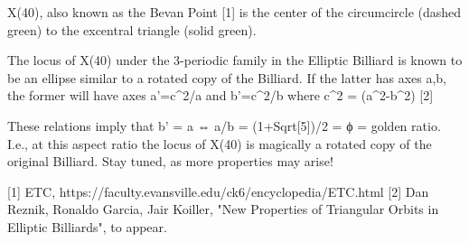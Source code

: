 X(40), also known as the Bevan Point [1] is the center of the circumcircle (dashed green) to the excentral triangle (solid green).

The locus of X(40) under the 3-periodic family in the Elliptic Billiard is known to be an ellipse similar to a rotated copy of the Billiard. If the latter has axes a,b, the former will have axes a'=c^2/a and b'=c^2/b where c^2 = (a^2-b^2) [2]

These relations imply that b' = a ⇔ a/b = (1+Sqrt[5])/2 = ϕ = golden ratio. I.e., at this aspect ratio the locus of X(40) is magically a rotated copy of the original Billiard. Stay tuned, as more properties may arise!

[1] ETC, https://faculty.evansville.edu/ck6/encyclopedia/ETC.html
[2] Dan Reznik, Ronaldo Garcia, Jair Koiller, "New Properties of Triangular Orbits in Elliptic Billiards", to appear.